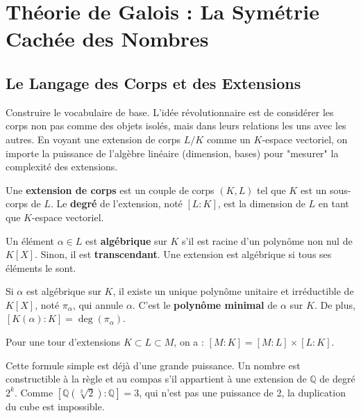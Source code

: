 \chapter{Théorie de Galois : La Symétrie Cachée des Nombres}

\section{Le Langage des Corps et des Extensions}

\begin{objectif}
    Construire le vocabulaire de base. L'idée révolutionnaire est de considérer les corps non pas comme des objets isolés, mais dans leurs relations les uns avec les autres. En voyant une extension de corps $L/K$ comme un $K$-espace vectoriel, on importe la puissance de l'algèbre linéaire (dimension, bases) pour "mesurer" la complexité des extensions.
\end{objectif}

\begin{definition}
    Une \textbf{extension de corps} est un couple de corps $(K,L)$ tel que $K$ est un sous-corps de $L$. Le \textbf{degré} de l'extension, noté $[L:K]$, est la dimension de $L$ en tant que $K$-espace vectoriel.
\end{definition}

\begin{definition}
    Un élément $\alpha \in L$ est \textbf{algébrique} sur $K$ s'il est racine d'un polynôme non nul de $K[X]$. Sinon, il est \textbf{transcendant}. Une extension est algébrique si tous ses éléments le sont.
\end{definition}

\begin{proposition}
    Si $\alpha$ est algébrique sur $K$, il existe un unique polynôme unitaire et irréductible de $K[X]$, noté $\pi_\alpha$, qui annule $\alpha$. C'est le \textbf{polynôme minimal} de $\alpha$ sur $K$. De plus, $[K(\alpha):K] = \deg(\pi_\alpha)$.
\end{proposition}

\begin{theorem}
    Pour une tour d'extensions $K \subset L \subset M$, on a : $[M:K] = [M:L] \times [L:K]$.
\end{theorem}

\begin{application}
    Cette formule simple est déjà d'une grande puissance. Un nombre est constructible à la règle et au compas s'il appartient à une extension de $\mathbb{Q}$ de degré $2^k$. Comme $[\mathbb{Q}(\sqrt[3]{2}):\mathbb{Q}]=3$, qui n'est pas une puissance de 2, la duplication du cube est impossible.
\end{application}

